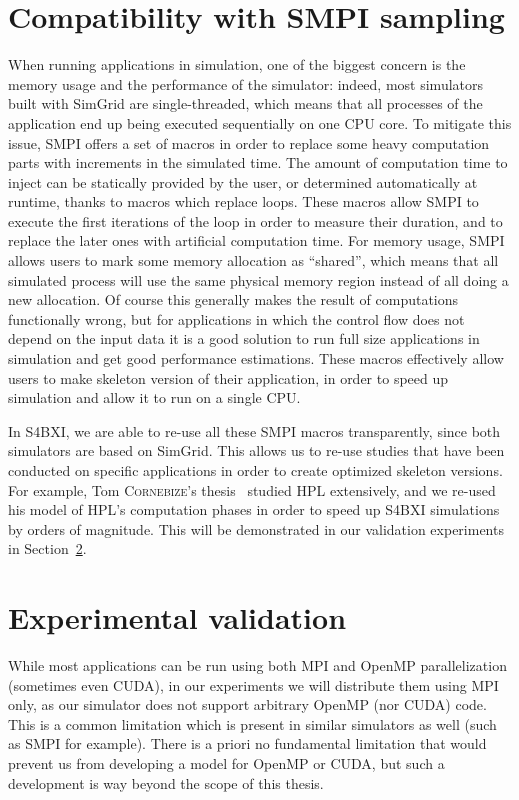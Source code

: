 \section{Compatibility with SMPI sampling}

When running applications in simulation, one of the biggest concern is the
memory usage and the performance of the simulator: indeed, most simulators built
with SimGrid are single-threaded, which means that all processes of the
application end up being executed sequentially on one CPU core. To mitigate this
issue, SMPI offers a set of macros in order to replace some heavy computation
parts with increments in the simulated time. The amount of computation time to
inject can be statically provided by the user, or determined automatically at
runtime, thanks to macros which replace  loops. These macros allow
SMPI to execute the first iterations of the loop in order to measure their
duration, and to replace the later ones with artificial computation time. For
memory usage, SMPI allows users to mark some memory allocation as ``shared'',
which means that all simulated process will use the same physical memory region
instead of all doing a new allocation. Of course this generally makes the result
of computations functionally wrong, but for applications in which the control
flow does not depend on the input data it is a good solution to run full size
applications in simulation and get good performance estimations. These macros
effectively allow users to make skeleton version of their application, in order
to speed up simulation and allow it to run on a single CPU.

In S4BXI, we are able to re-use all these SMPI macros transparently, since both
simulators are based on SimGrid. This allows us to re-use studies that have been
conducted on specific applications in order to create optimized skeleton
versions. For example, Tom \textsc{Cornebize}'s thesis~\cite{Cornebize2021}
studied HPL extensively, and we re-used his model of HPL's computation phases in
order to speed up S4BXI simulations by orders of magnitude. This will be
demonstrated in our validation experiments in
Section~\ref{sec:5_high_level:benchmarks}.

\section{Experimental validation}
\label{sec:5_high_level:benchmarks}

While most applications can be run using both MPI and OpenMP parallelization
(sometimes even CUDA), in our experiments we will distribute them using MPI
only, as our simulator does not support arbitrary OpenMP (nor CUDA) code. This
is a common limitation which is present in similar simulators as well (such as
SMPI for example). There is a priori no fundamental limitation that would
prevent us from developing a model for OpenMP or CUDA, but such a development is
way beyond the scope of this thesis.

